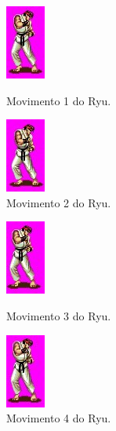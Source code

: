 \documentclass[12pt]{article}
\begin{document}
	\begin{figure}[H]
		\centering
		\begin{minipage}{.5\textwidth}
			\centering
			\includegraphics[width=.125\textwidth]{parte1.jpg}
			\caption{Movimento 1 do Ryu.}
			\label{fig:Ryu1}
		\end{minipage}
		\begin{minipage}{.5\textwidth}
			\centering
			\includegraphics[width=.125\textwidth]{parte2.jpg}
			\caption{Movimento 2 do Ryu.}
			\label{fig:Ryu2}
		\end{minipage}
		\label{fig:SpriteRyu1}
	\end{figure}	
	\begin{figure}[H]
		\centering
		\begin{minipage}{.5\textwidth}
			\centering
			\includegraphics[width=.125\textwidth]{parte3.jpg}
			\caption{Movimento 3 do Ryu.}
			\label{fig:Ryu3}
		\end{minipage}
		\begin{minipage}{.5\textwidth}
			\centering
			\includegraphics[width=.125\textwidth]{parte4.jpg}
			\caption{Movimento 4 do Ryu.}
			\label{fig:Ryu4}
		\end{minipage}
		\label{fig:SpriteRyu2}
	\end{figure}
	
\end{document}
